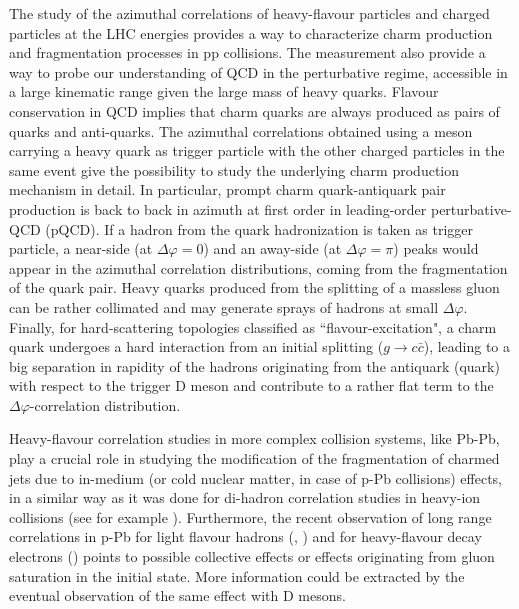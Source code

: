 
The study of the azimuthal correlations of heavy-flavour particles and charged particles at the LHC energies provides a way to characterize charm production and fragmentation processes in pp collisions. The measurement also provide a way to probe our understanding of QCD in the perturbative regime, accessible in a large kinematic range given the large mass of heavy quarks. Flavour conservation in QCD implies that charm quarks are always produced as pairs of quarks and anti-quarks. The azimuthal correlations obtained using a meson carrying a heavy quark as trigger particle with the other charged particles in the same event give the possibility to study the underlying charm production mechanism in detail. In particular, prompt charm quark-antiquark pair production is back to back in azimuth at first order in leading-order perturbative-QCD (pQCD). If a hadron from the quark hadronization is taken as trigger particle, a near-side (at $\Delta\varphi = 0$) and an away-side (at $\Delta\varphi = \pi$) peaks would appear in the azimuthal correlation distributions, coming from the fragmentation of the quark pair. Heavy quarks produced from the splitting of a massless gluon can be rather collimated and may generate sprays of hadrons at small $\Delta\varphi$. Finally, for hard-scattering topologies classified as ``flavour-excitation", a charm quark undergoes a hard interaction from an initial splitting ($g\to c\bar{c}$), leading to a big separation in rapidity of the hadrons originating from the antiquark (quark) with respect to the trigger D meson and contribute to a rather flat term to the $\Delta\varphi$-correlation distribution.

Heavy-flavour correlation studies in more complex collision systems, like Pb-Pb, play a crucial role in studying the modification of the fragmentation of charmed jets due to in-medium (or cold nuclear matter, in case of p-Pb collisions) effects, in a similar way as it was done for di-hadron correlation studies in heavy-ion collisions (see for example \cite{ALICEPbPbdih}). Furthermore, the recent observation of long range correlations in p-Pb for light flavour hadrons (\cite{ALICEv2ppb}, \cite{ALICEv2ppb2}) and for heavy-flavour decay electrons (\cite{ALICEv2HFe}) points to possible collective effects or effects originating from gluon saturation in the initial state. More information could be extracted by the eventual observation of the same effect with D mesons.\\

